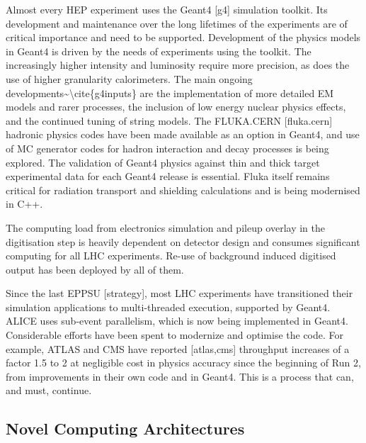 Almost every HEP experiment uses the Geant4 {[}g4{]} simulation toolkit.
Its development and maintenance over the long lifetimes of the
experiments are of critical importance and need to be supported.
Development of the physics models in Geant4 is driven by the needs of
experiments using the toolkit. The increasingly higher intensity and
luminosity require more precision, as does the use of higher granularity
calorimeters. The main ongoing
developments\textasciitilde\textbackslash cite\{g4inputs\} are the
implementation of more detailed EM models and rarer processes, the
inclusion of low energy nuclear physics effects, and the continued
tuning of string models. The FLUKA.CERN {[}fluka.cern{]} hadronic
physics codes have been made available as an option in Geant4, and use
of MC generator codes for hadron interaction and decay processes is
being explored. The validation of Geant4 physics against thin and thick
target experimental data for each Geant4 release is essential. Fluka
itself remains critical for radiation transport and shielding
calculations and is being modernised in C++.

The computing load from electronics simulation and pileup overlay in the
digitisation step is heavily dependent on detector design and consumes
significant computing for all LHC experiments. Re-use of background
induced digitised output has been deployed by all of them.

Since the last EPPSU {[}strategy{]}, most LHC experiments have
transitioned their simulation applications to multi-threaded execution,
supported by Geant4. ALICE uses sub-event parallelism, which is now
being implemented in Geant4. Considerable efforts have been spent to
modernize and optimise the code. For example, ATLAS and CMS have
reported {[}atlas,cms{]} throughput increases of a factor 1.5 to 2 at
negligible cost in physics accuracy since the beginning of Run 2, from
improvements in their own code and in Geant4. This is a process that
can, and must, continue.

\subsection{Novel Computing
Architectures}\label{novel-computing-architectures}

